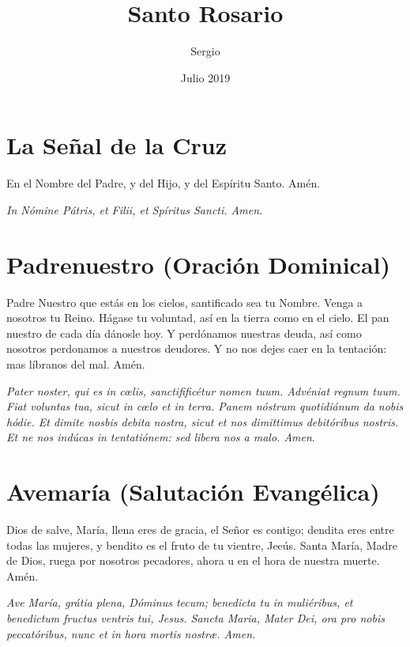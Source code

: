\documentclass[a4paper,11pt, oneside]{report}
\title{Santo Rosario}
\author{Sergio}
\date{Julio 2019}
\begin{document}
  
\begin{titlepage}
  \maketitle    
\end{titlepage}

\section*{La Señal de la Cruz}
  {  
    En el Nombre del Padre, y del Hijo, y del Espíritu Santo. Amén.

    \medskip

    \textit{In Nómine Pátris, et Filii, et Spíritus Sancti. Amen.}
  }

\section*{Padrenuestro (Oración Dominical)}
  {  
    Padre Nuestro que estás en los cielos, santificado sea tu Nombre. Venga a nosotros tu Reino. Hágase tu voluntad, así en la tierra como
    en el cielo. El pan nuestro de cada día dánosle hoy. Y perdónamos nuestras deuda, así como nosotros perdonamos a nuestros deudores.
    Y no nos dejes caer en la tentación: mas líbranos del mal. Amén.
    
    \medskip

    \textit{Pater noster, qui es in c{\oe}lis, sanctifificétur nomen tuum. Advéniat regnum tuum. Fiat voluntas tua, sicut in c{\oe}lo et in terra.
    Panem nóstrum quotidiánum da nobis hódie. Et dimite nosbis debita nostra, sicut et nos dimittimus debitóribus nostris. Et ne nos indúcas
    in tentatiónem: sed libera nos a malo. Amen}.
  }

\section*{Avemaría (Salutación Evangélica)}
  {  
    Dios de salve, María, llena eres de gracia, el Señor es contigo; dendita eres entre todas las mujeres, y bendito es el fruto de tu
    vientre, Jeeús. Santa María, Madre de Dios, ruega por nosotros pecadores, ahora u en el hora de nuestra muerte. Amén.
    
    \medskip

    \textit{Ave María, grátia plena, Dóminus tecum; benedicta tu in muliéribus, et benedictum fructus ventris tui, Jesus.
    Sancta Maria, Mater Dei, ora pro nobis peccatóribus, nunc et in hora mortis nostr{\ae}. Amen.}
  }
\end{document}
